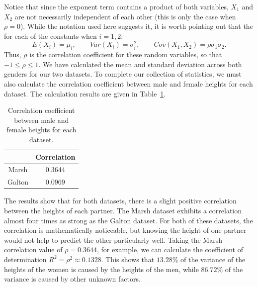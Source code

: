 Notice that since the exponent term contains a product of both variables, $X_1$ and $X_2$ are not necessarily independent of each other (this is only the case when $\rho=0$).
While the notation used here suggests it, it is worth pointing out that the for each of the constants when $i=1,2$:
\begin{equation}
    E(X_i)=\mu_i, \qquad Var(X_i)=\sigma_i^2, \qquad Cov(X_1,X_2)=\rho\sigma_1\sigma_2.
    \label{eq:statistics-of-x-i}
\end{equation}
Thus, $\rho$ is the correlation coefficient for these random variables, so that $-1\le{\rho}\le{1}$.
We have calculated the mean and standard deviation across both genders for our two datasets.
To complete our collection of statistics, we must also calculate the correlation coefficient between male and female heights for each dataset.
The calculation results are given in Table~\ref{tab:correlation}.

\begin{table}[h]
    \centering
    \begin{tabular}{c|c}
         & Correlation\\
         \midrule
        Marsh & 0.3644\\
        Galton & 0.0969\\
    \end{tabular}
    \caption{Correlation coefficient between male and female heights for each dataset.}
    \label{tab:correlation}
\end{table}

The results show that for both datasets, there is a slight positive correlation between the heights of each partner.
The Marsh dataset exhibits a correlation almost four times as strong as the Galton dataset.
For both of these datasets, the correlation is mathematically noticeable, but knowing the height of one partner would not help to predict the other particularly well.
Taking the Marsh correlation value of $\rho=0.3644$, for example, we can calculate the coefficient of determination $R^2=\rho^2\approx0.1328$.
This shows that $13.28\%$ of the variance of the heights of the women is caused by the heights of the men, while $86.72\%$ of the variance is caused by other unknown factors.

